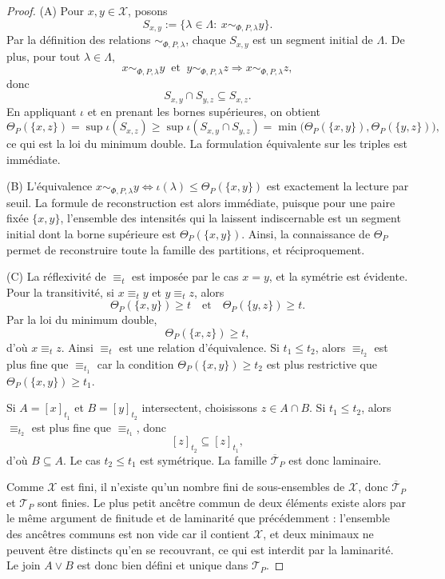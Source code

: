 \documentclass[11pt,a4paper]{article}
\begin{document}
\begin{proof}
(A) Pour \(x,y\in\mathcal X\), posons
\[
S_{x,y}:=\{\lambda\in\Lambda:\ x\sim_{\Phi,P,\lambda}y\}.
\]
Par la définition des relations \(\sim_{\Phi,P,\lambda}\), chaque \(S_{x,y}\) est un segment initial de \(\Lambda\). De plus, pour tout \(\lambda\in\Lambda\),
\[
x\sim_{\Phi,P,\lambda}y\ \text{ et }\ y\sim_{\Phi,P,\lambda}z
\Longrightarrow
x\sim_{\Phi,P,\lambda}z,
\]
donc
\[
S_{x,y}\cap S_{y,z}\subseteq S_{x,z}.
\]
En appliquant \(\iota\) et en prenant les bornes supérieures, on obtient
\[
\Theta_P(\{x,z\})
=
\sup \iota(S_{x,z})
\ge
\sup \iota(S_{x,y}\cap S_{y,z})
=
\min\bigl(\Theta_P(\{x,y\}),\Theta_P(\{y,z\})\bigr),
\]
ce qui est la loi du minimum double. La formulation équivalente sur les triples est immédiate.

(B) L'équivalence \(x\sim_{\Phi,P,\lambda}y \Longleftrightarrow \iota(\lambda)\le \Theta_P(\{x,y\})\) est exactement la lecture par seuil. La formule de reconstruction est alors immédiate, puisque pour une paire fixée \(\{x,y\}\), l'ensemble des intensités qui la laissent indiscernable est un segment initial dont la borne supérieure est \(\Theta_P(\{x,y\})\). Ainsi, la connaissance de \(\Theta_P\) permet de reconstruire toute la famille des partitions, et réciproquement.

(C) La réflexivité de \(\equiv_t\) est imposée par le cas \(x=y\), et la symétrie est évidente. Pour la transitivité, si \(x\equiv_t y\) et \(y\equiv_t z\), alors
\[
\Theta_P(\{x,y\})\ge t
\quad\text{et}\quad
\Theta_P(\{y,z\})\ge t.
\]
Par la loi du minimum double,
\[
\Theta_P(\{x,z\})\ge t,
\]
d'où \(x\equiv_t z\). Ainsi \(\equiv_t\) est une relation d'équivalence. Si \(t_1\le t_2\), alors \(\equiv_{t_2}\) est plus fine que \(\equiv_{t_1}\) car la condition \(\Theta_P(\{x,y\})\ge t_2\) est plus restrictive que \(\Theta_P(\{x,y\})\ge t_1\).

Si \(A=[x]_{t_1}\) et \(B=[y]_{t_2}\) intersectent, choisissons \(z\in A\cap B\). Si \(t_1\le t_2\), alors \(\equiv_{t_2}\) est plus fine que \(\equiv_{t_1}\), donc
\[
[z]_{t_2}\subseteq [z]_{t_1},
\]
d'où \(B\subseteq A\). Le cas \(t_2\le t_1\) est symétrique. La famille \(\overline{\mathcal T}_P\) est donc laminaire.

Comme \(\mathcal X\) est fini, il n'existe qu'un nombre fini de sous-ensembles de \(\mathcal X\), donc \(\overline{\mathcal T}_P\) et \(\mathcal T_P\) sont finies. Le plus petit ancêtre commun de deux éléments existe alors par le même argument de finitude et de laminarité que précédemment : l'ensemble des ancêtres communs est non vide car il contient \(\mathcal X\), et deux minimaux ne peuvent être distincts qu'en se recouvrant, ce qui est interdit par la laminarité. Le join \(A\vee B\) est donc bien défini et unique dans \(\mathcal T_P\).


\end{proof}
\end{document}
